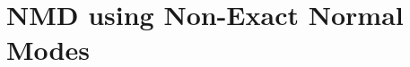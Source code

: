\documentclass[aps,prb,twocolumn,superscriptaddress,amsmath,amssymb,floatfix]{revtex4}
\begin{document}


\section{\label{A:NMD XCORR}
NMD using Non-Exact Normal Modes}
\end{document}
